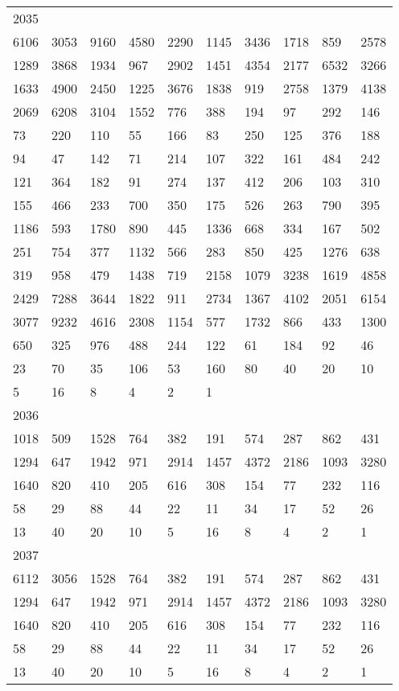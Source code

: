 \begin{longtable}{*{10}{l}}
2035&&&&&&&&&\\
6106& 3053& 9160& 4580& 2290& 1145& 3436& 1718& 859& 2578\\
1289& 3868& 1934& 967& 2902& 1451& 4354& 2177& 6532& 3266\\
1633& 4900& 2450& 1225& 3676& 1838& 919& 2758& 1379& 4138\\
2069& 6208& 3104& 1552& 776& 388& 194& 97& 292& 146\\
73& 220& 110& 55& 166& 83& 250& 125& 376& 188\\
94& 47& 142& 71& 214& 107& 322& 161& 484& 242\\
121& 364& 182& 91& 274& 137& 412& 206& 103& 310\\
155& 466& 233& 700& 350& 175& 526& 263& 790& 395\\
1186& 593& 1780& 890& 445& 1336& 668& 334& 167& 502\\
251& 754& 377& 1132& 566& 283& 850& 425& 1276& 638\\
319& 958& 479& 1438& 719& 2158& 1079& 3238& 1619& 4858\\
2429& 7288& 3644& 1822& 911& 2734& 1367& 4102& 2051& 6154\\
3077& 9232& 4616& 2308& 1154& 577& 1732& 866& 433& 1300\\
650& 325& 976& 488& 244& 122& 61& 184& 92& 46\\
23& 70& 35& 106& 53& 160& 80& 40& 20& 10\\
5& 16& 8& 4& 2& 1& \\

2036&&&&&&&&&\\
1018& 509& 1528& 764& 382& 191& 574& 287& 862& 431\\
1294& 647& 1942& 971& 2914& 1457& 4372& 2186& 1093& 3280\\
1640& 820& 410& 205& 616& 308& 154& 77& 232& 116\\
58& 29& 88& 44& 22& 11& 34& 17& 52& 26\\
13& 40& 20& 10& 5& 16& 8& 4& 2& 1\\

2037&&&&&&&&&\\
6112& 3056& 1528& 764& 382& 191& 574& 287& 862& 431\\
1294& 647& 1942& 971& 2914& 1457& 4372& 2186& 1093& 3280\\
1640& 820& 410& 205& 616& 308& 154& 77& 232& 116\\
58& 29& 88& 44& 22& 11& 34& 17& 52& 26\\
13& 40& 20& 10& 5& 16& 8& 4& 2& 1\\


\end{longtable}
